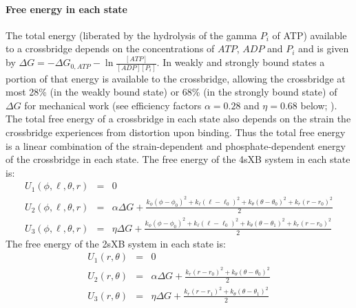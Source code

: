 \documentclass[]{article}
\begin{document}
\paragraph{Free energy in each state} %
The total energy (liberated by the hydrolysis of the gamma $P_i$ of ATP) available to a crossbridge depends on the concentrations of $ATP$, $ADP$ and $P_i$ and is given by $\Delta G = -\Delta G_{0,ATP} - \ln \frac{[ATP]}{[ADP] [P_i]}$. 
In weakly and strongly bound states a portion of that energy is available to the crossbridge, allowing the crossbridge at most 28\% (in the weakly bound state) or 68\% (in the strongly bound state) of $\Delta G$ for mechanical work (see efficiency factors $\alpha=0.28$ and $\eta=0.68$ below; \citet{Pate1989, Tanner2007}).
The total free energy of a crossbridge in each state also depends on the strain the crossbridge experiences from distortion upon binding.
Thus the total free energy is a linear combination of the strain-dependent and phosphate-dependent energy of the crossbridge in each state.
The free energy of the 4sXB system in each state is: 
\begin{eqnarray}
\label{4sEnergy}
U_1(\phi,\ell,\theta,r) & = & 0 \nonumber \\
U_2(\phi,\ell,\theta,r) & = & \alpha \Delta G + \frac{k_\phi (\phi-\phi_0)^2 + k_\ell (\ell-\ell_0)^2 + k_\theta (\theta-\theta_0)^2 + k_r (r-r_0)^2}{2} \nonumber \\
U_3(\phi,\ell,\theta,r) & = & \eta \Delta G + \frac{k_\phi (\phi-\phi_0)^2 + k_\ell (\ell-\ell_0)^2 + k_\theta (\theta-\theta_1)^2 + k_r (r-r_0)^2}{2} \nonumber
\end{eqnarray}
The free energy of the 2sXB system in each state is: 
\begin{eqnarray}
\label{2sEnergy}
	U_1(r,\theta) & = & 0 \nonumber \\
    U_2(r,\theta) & = & \alpha \Delta G + \frac{k_r (r - r_0)^2 + 
                        k_\theta (\theta - \theta_0)^2}{2} \nonumber \\
    U_3(r,\theta) & = & \eta \Delta G   + \frac{k_r (r - r_1)^2 + 
                        k_\theta (\theta - \theta_1)^2}{2} \nonumber
\end{eqnarray}
\end{document}
